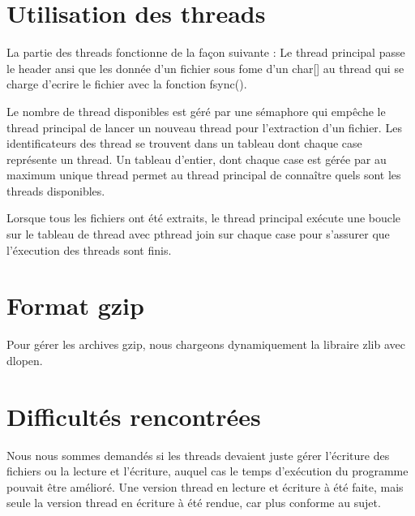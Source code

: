 \documentclass[a4paper,11pt, oneside]{book}
\begin{document}
\section*{Utilisation des threads}

La partie des threads fonctionne de la façon suivante : Le thread principal passe le header ansi que les donnée d'un fichier sous fome d'un char[] au thread qui se charge d'ecrire le fichier avec la fonction fsync().

Le nombre de thread disponibles est géré par une sémaphore qui empêche le thread principal de lancer un nouveau thread pour l'extraction d'un fichier. Les identificateurs des thread se trouvent dans un tableau dont chaque case représente un thread. Un tableau d'entier, dont chaque case est gérée par  au maximum unique thread permet au thread principal de connaître quels sont les threads disponibles.

Lorsque tous les fichiers ont été extraits, le thread principal exécute une boucle sur le tableau de thread  avec pthread join sur chaque case pour s'assurer que l'éxecution des  threads sont finis.\\

\section*{Format gzip}

Pour gérer les archives gzip, nous chargeons dynamiquement la libraire zlib avec dlopen.


\section*{Difficultés rencontrées}

Nous nous sommes demandés si les threads devaient juste gérer l’écriture des fichiers ou la lecture et l'écriture, auquel cas le temps d'exécution du programme pouvait être amélioré. Une version thread en lecture et écriture à été faite, mais seule la version thread en écriture à été rendue, car plus conforme au sujet.\\
\end{document}
